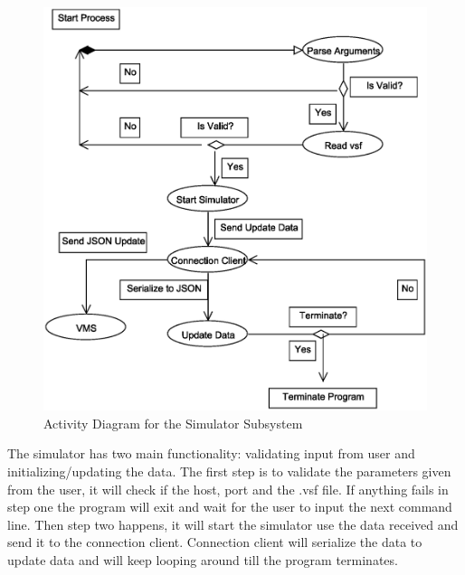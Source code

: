 \documentclass{article}
\begin{document}
\begin{figure}[!htb]
\caption{Activity Diagram for the Simulator Subsystem}
\centering
\includegraphics[scale=0.35]{diagrams/simulator-acitivity-diagram.eps}
\end{figure}
The simulator has two main functionality: validating input from user and initializing/updating the data. 
The first step is to validate the parameters given from the user, it will check if the host, port and the .vsf file. 
If anything fails in step one the program will exit and wait for the user to input the next command line.
Then step two happens, it will start the simulator use the data received and send it to the connection client.
Connection client will serialize the data to update data and will keep looping around till the program terminates.
\end{document}
